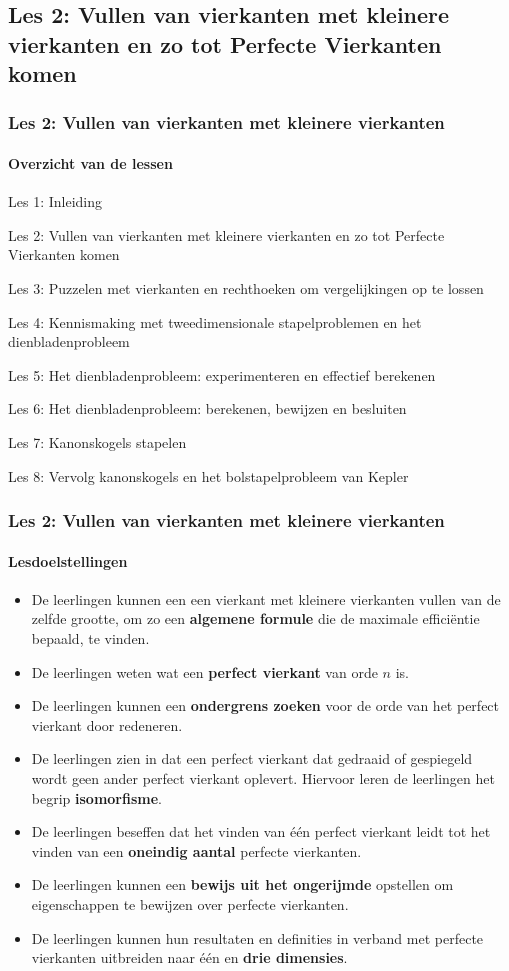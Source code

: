 \documentclass[dutch]{beamer}
\begin{document}
\subsection{Les 2: Vullen van vierkanten met kleinere vierkanten en zo tot Perfecte Vierkanten komen}
\begin{frame}
\frametitle{Les 2: Vullen van vierkanten met kleinere vierkanten}
\framesubtitle{Overzicht van de lessen}
\begin{list}{\quad}{}
\item Les 1: Inleiding
\item {\color{blue}Les 2: Vullen van vierkanten met kleinere vierkanten en zo tot Perfecte Vierkanten komen}
\item Les 3: Puzzelen met vierkanten en rechthoeken om vergelijkingen op te lossen
\item Les 4: Kennismaking met tweedimensionale stapelproblemen en het dienbladenprobleem 
\item Les 5: Het dienbladenprobleem: experimenteren en effectief berekenen
\item Les 6: Het dienbladenprobleem: berekenen, bewijzen en besluiten
\item Les 7: Kanonskogels stapelen
\item Les 8: Vervolg kanonskogels en het bolstapelprobleem van Kepler
\end{list}
\end{frame}

\begin{frame}
\frametitle{Les 2: Vullen van vierkanten met kleinere vierkanten}
\framesubtitle{Lesdoelstellingen}
\small
\begin{itemize}
\item De leerlingen kunnen een een vierkant met kleinere vierkanten vullen van de zelfde grootte, om zo een {\bf algemene formule} die de maximale effici\"{e}ntie bepaald, te vinden.
\item De leerlingen weten wat een {\bf perfect vierkant} van orde $n$ is.
\item De leerlingen kunnen een {\bf ondergrens zoeken} voor de orde van het perfect vierkant door redeneren.
\item De leerlingen zien in dat een perfect vierkant dat gedraaid of gespiegeld wordt geen ander perfect vierkant oplevert. Hiervoor leren de leerlingen het begrip {\bf isomorfisme}.
\item De leerlingen beseffen dat het vinden van \'{e}\'{e}n perfect vierkant leidt tot het vinden van een {\bf oneindig aantal} perfecte vierkanten. 
\item De leerlingen kunnen een {\bf bewijs uit het ongerijmde} opstellen om eigenschappen te bewijzen over perfecte vierkanten.
\item De leerlingen kunnen hun resultaten en definities in verband met perfecte vierkanten uitbreiden naar \'{e}\'{e}n en {\bf drie dimensies}.
\end{itemize}
\end{frame}
\end{document}
